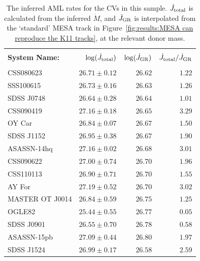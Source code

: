 \begin{table}
    \centering
    \caption{The inferred AML rates for the CVs in this sample. $\dot J_{\rm total}$ is calculated from the inferred $\dot M$, and $\dot J_{\rm GR}$ is interpolated from the `standard' MESA track in Figure~\ref{fig:results:MESA can reproduce the K11 tracks}, at the relevant donor mass.}
    \label{table:results:Jdot results}
    \begin{tabular}{lrrr}
        \hline \\
        {\bf System Name:}  & \textbf{$\log(\dot J_{\rm total})$} & \textbf{$\log(\dot J_{\rm GR})$} & \textbf{$\dot J_{\rm total} / \dot J_{\rm GR}$} \\
        \hline \hline \\
        CSS080623           & $26.71 \pm 0.12$  &  $26.62$  &  $1.22$ \\
        SSS100615           & $26.73 \pm 0.16$  &  $26.63$  &  $1.26$ \\
        SDSS J0748          & $26.64 \pm 0.28$  &  $26.64$  &  $1.01$ \\
        CSS090419           & $27.16 \pm 0.18$  &  $26.65$  &  $3.29$ \\
        OY Car              & $26.84 \pm 0.07$  &  $26.67$  &  $1.50$ \\
        SDSS J1152          & $26.95 \pm 0.38$  &  $26.67$  &  $1.90$ \\
        ASASSN-14hq         & $27.16 \pm 0.02$  &  $26.68$  &  $3.01$ \\
        CSS090622           & $27.00 \pm 0.74$  &  $26.70$  &  $1.96$ \\
        CSS110113           & $26.90 \pm 0.71$  &  $26.70$  &  $1.55$ \\
        AY For              & $27.19 \pm 0.52$  &  $26.70$  &  $3.02$ \\
        MASTER OT J0014     & $26.84 \pm 0.59$  &  $26.75$  &  $1.25$ \\
        OGLE82              & $25.44 \pm 0.55$  &  $26.77$  &  $0.05$ \\
        SDSS J0901          & $26.55 \pm 0.70$  &  $26.78$  &  $0.58$ \\
        ASASSN-15pb         & $27.09 \pm 0.44$  &  $26.80$  &  $1.97$ \\
        SDSS J1524          & $26.99 \pm 0.17$  &  $26.58$  &  $2.59$ \\
        \hline
    \end{tabular}
\end{table}


